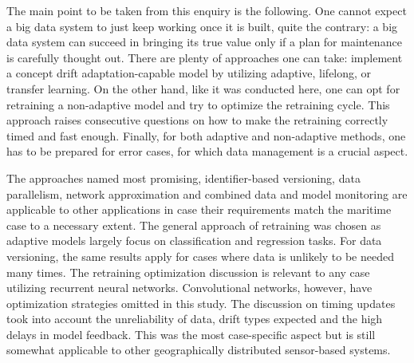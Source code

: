 The main point to be taken from this enquiry is the following. One cannot expect a big data system to just keep working once it is built, quite the contrary: a big data system can succeed in bringing its true value only if a plan for maintenance is carefully thought out. There are plenty of approaches one can take: implement a concept drift adaptation-capable model by utilizing adaptive, lifelong, or transfer learning. On the other hand, like it was conducted here, one can opt for retraining a non-adaptive model and try to optimize the retraining cycle. This approach raises consecutive questions on how to make the retraining correctly timed and fast enough. Finally, for both adaptive and non-adaptive methods, one has to be prepared for error cases, for which data management is a crucial aspect.

The approaches named most promising, identifier-based versioning, data parallelism, network approximation and combined data and model monitoring are applicable to other applications in case their requirements match the maritime case to a necessary extent. The general approach of retraining was chosen as adaptive models largely focus on classification and regression tasks. For data versioning, the same results apply for cases where data is unlikely to be needed many times. The retraining optimization discussion is relevant to any case utilizing recurrent neural networks. Convolutional networks, however, have optimization strategies omitted in this study. The discussion on timing updates took into account the unreliability of data, drift types expected and the high delays in model feedback. This was the most case-specific aspect but is still somewhat applicable to other geographically distributed sensor-based systems.


 
 
